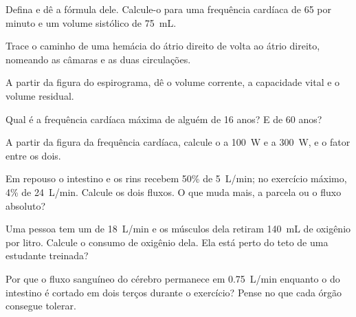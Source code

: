 \begin{exercise}[$\star$]\label{exo:g10:heart-lungs-effort:2}
Defina  e dê a fórmula dele. Calcule-o para uma
frequência cardíaca de 65 por minuto e um volume sistólico de
\qty{75}{mL}.
\end{exercise}

\begin{exercise}[$\star$]\label{exo:g10:heart-lungs-effort:3}
Trace o caminho de uma hemácia do átrio direito de volta ao átrio
direito, nomeando as câmaras e as duas circulações.
\end{exercise}

\begin{exercise}[$\star$]\label{exo:g10:heart-lungs-effort:4}
A partir da figura do espirograma, dê o volume corrente, a capacidade
vital e o volume residual.
\end{exercise}

\begin{exercise}[$\star$]\label{exo:g10:heart-lungs-effort:5}
Qual é a frequência cardíaca máxima de alguém de 16 anos? E de 60 anos?
\end{exercise}

\begin{exercise}[$\star\star$]\label{exo:g10:heart-lungs-effort:6}
A partir da figura da frequência cardíaca, calcule o  a
\qty{100}{W} e a \qty{300}{W}, e o fator entre os dois.
\end{exercise}

\begin{exercise}[$\star\star$]\label{exo:g10:heart-lungs-effort:7}
Em repouso o intestino e os rins recebem 50\% de \qty{5}{L/min}; no
exercício máximo, 4\% de \qty{24}{L/min}. Calcule os dois fluxos. O que
muda mais, a parcela ou o fluxo absoluto?
\end{exercise}

\begin{exercise}[$\star\star$]\label{exo:g10:heart-lungs-effort:8}
Uma pessoa tem um  de \qty{18}{L/min} e os músculos dela
retiram \qty{140}{mL} de oxigênio por litro. Calcule o consumo de
oxigênio dela. Ela está perto do teto de uma estudante treinada?
\end{exercise}

\begin{exercise}[$\star\star$]\label{exo:g10:heart-lungs-effort:9}
Por que o fluxo sanguíneo do cérebro permanece em \qty{0.75}{L/min}
enquanto o do intestino é cortado em dois terços durante o exercício?
Pense no que cada órgão consegue tolerar.
\end{exercise}

